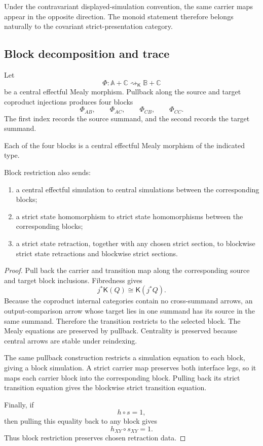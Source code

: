 Under the contravariant displayed-simulation convention, the same carrier
maps appear in the opposite direction.  The monoid statement therefore
belongs naturally to the covariant strict-presentation category.

\subsection{Block decomposition and trace}
\label{subsec:effectful-block-trace}

Let
\[
    \Phi:
    \mathbb A+\mathbb C
    \rightsquigarrow_{\mathsf K}
    \mathbb B+\mathbb C
\]
be a central effectful Mealy morphism.  Pullback along the source and target
coproduct injections produces four blocks
\[
    \Phi_{AB},
    \qquad
    \Phi_{AC},
    \qquad
    \Phi_{CB},
    \qquad
    \Phi_{CC}.
\]
The first index records the source summand, and the second records the target
summand.

\begin{proposition}
\label{prop:effectful-block-restriction}
Each of the four blocks is a central effectful Mealy morphism of the indicated
type.

Block restriction also sends:
\begin{enumerate}
    \item a central effectful simulation to central simulations between the
    corresponding blocks;

    \item a strict state homomorphism to strict state homomorphisms between
    the corresponding blocks;

    \item a strict state retraction, together with any chosen strict section,
    to blockwise strict state retractions and blockwise strict sections.
\end{enumerate}
\end{proposition}

\begin{proof}
Pull back the carrier and transition map along the corresponding source and
target block inclusions.  Fibredness gives
\[
    j^*\mathsf K(Q)
    \cong
    \mathsf K(j^*Q).
\]
Because the coproduct internal categories contain no cross-summand arrows,
an output-comparison arrow whose target lies in one summand has its source in
the same summand.  Therefore the transition restricts to the selected block.
The Mealy equations are preserved by pullback.  Centrality is preserved
because central arrows are stable under reindexing.

The same pullback construction restricts a simulation equation to each
block, giving a block simulation.  A strict carrier map preserves both
interface legs, so it maps each carrier block into the corresponding block.
Pulling back its strict transition equation gives the blockwise strict
transition equation.

Finally, if
\[
    h\circ s=1,
\]
then pulling this equality back to any block gives
\[
    h_{XY}\circ s_{XY}=1.
\]
Thus block restriction preserves chosen retraction data.
\end{proof}

